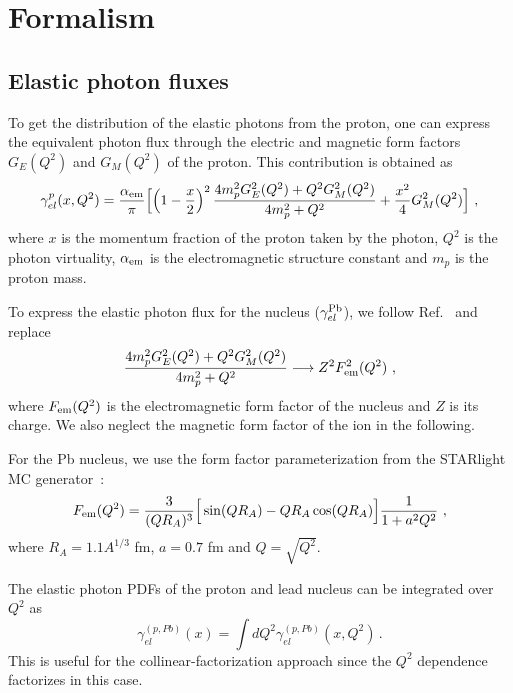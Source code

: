 \section{Formalism}

\subsection{Elastic photon fluxes}


To get the distribution of the elastic photons from the proton, one can express the equivalent photon flux through
the electric and magnetic form factors $G_E(Q^2)$ and $G_M(Q^2)$ of the proton.
This contribution is obtained as
\begin{eqnarray}
   \gamma^{p}_{el}(x,Q^2) = \frac{\alpha_{\rm{em}}}{\pi}
\Big[ \Big( 1- {x \over 2} \Big)^2 \, {4 m_p^2 G_E^2(Q^2) + Q^2 G_M^2(Q^2) \over 4m_p^2 + Q^2} + {x^2 \over 4} G_M^2(Q^2) \Big]~,
\label{proton_el_flux}
\end{eqnarray}
where $x$ is the momentum fraction of the proton taken by the photon, $Q^2$ is the photon virtuality, $\alpha_{\rm{em}}$ is the electromagnetic structure constant and $m_p$ is the proton mass.

To express the elastic photon flux for the nucleus ($\gamma^{\rm Pb}_{el}$), we follow Ref.~\cite{Budnev:1974de} and replace 
\begin{eqnarray}
 {4 m_p^2 G_E^2(Q^2) + Q^2 G_M^2(Q^2) \over 4m_p^2 + Q^2} \longrightarrow Z^2 F_{\rm em}^2(Q^2)~,
 \end{eqnarray}
where $F_{\rm em}(Q^2)$ is the electromagnetic form factor of the nucleus and $Z$ is its charge.
We also neglect the magnetic form factor of the ion in the following.

For the Pb nucleus, we use the form factor parameterization from the STARlight MC generator~\cite{Klein:2016yzr}:
\begin{eqnarray}
 F_{\rm em}(Q^2) = {3 \over (QR_A)^3}\Big[ \sin(QR_A) - QR_A \cos(QR_A) \Big] { 1 \over 1 + a^2 Q^2}~,
 \label{pb_el_flux}
\end{eqnarray}
where $R_A = 1.1 A^{1/3}$ fm, $a = 0.7$ fm and $Q = \sqrt{Q^2}$.

The elastic photon PDFs of the proton and lead nucleus can be integrated over $Q^2$ as 
\begin{equation}
\gamma^{(p,Pb)}_{el}(x)  = \int d Q^2 \gamma^{(p,Pb)}_{el}(x, Q^2) \,.
 \label{integral_flux}
\end{equation}
This is useful for the collinear-factorization approach since the $Q^2$ dependence factorizes in this case. 
